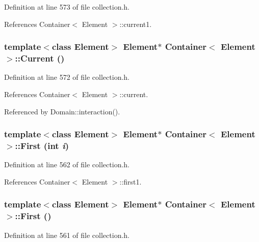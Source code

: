 Definition at line 573 of file collection.h.

References Container$<$ Element $>$::current1.\hypertarget{classContainer_cbf0295eef7a11efdb07137014ab7e0c}{
\subsubsection[{Current}]{\setlength{\rightskip}{0pt plus 5cm}template$<$class Element$>$ Element$\ast$ {\bf Container}$<$ Element $>$::Current ()}}
\label{classContainer_cbf0295eef7a11efdb07137014ab7e0c}




Definition at line 572 of file collection.h.

References Container$<$ Element $>$::current.

Referenced by Domain::interaction().\hypertarget{classContainer_d8149821d1af2a00534c8aacf7a8b847}{
\subsubsection[{First}]{\setlength{\rightskip}{0pt plus 5cm}template$<$class Element$>$ Element$\ast$ {\bf Container}$<$ Element $>$::First (int {\em i})}}
\label{classContainer_d8149821d1af2a00534c8aacf7a8b847}




Definition at line 562 of file collection.h.

References Container$<$ Element $>$::first1.\hypertarget{classContainer_01da95c79542f8a2e770fce83a99928f}{
\subsubsection[{First}]{\setlength{\rightskip}{0pt plus 5cm}template$<$class Element$>$ Element$\ast$ {\bf Container}$<$ Element $>$::First ()}}
\label{classContainer_01da95c79542f8a2e770fce83a99928f}




Definition at line 561 of file collection.h.

